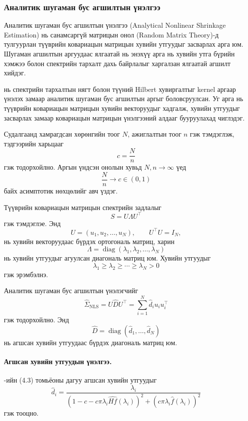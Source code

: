 
\subsubsection{Аналитик шугаман бус агшилтын үнэлгээ}

Аналитик шугаман бус агшилтын үнэлгээ
(Analytical Nonlinear Shrinkage Estimation) нь
санамсаргүй матрицын онол (Random Matrix Theory)-д
тулгуурлан түүврийн ковариацын матрицын хувийн
утгуудыг засварлах арга юм. Шугаман агшилтын
аргуудаас ялгаатай нь энэхүү арга нь хувийн
утга бүрийн хэмжээ болон спектрийн тархалт дахь
байрлалыг харгалзан ялгаатай агшилт хийдэг.

\citet{ledoitwolf2020} нь спектрийн тархалтын
нягт болон түүний Hilbert хувиргалтыг kernel
аргаар үнэлэх замаар аналитик шугаман бус
агшилтын аргыг боловсруулсан. Уг арга нь
түүврийн ковариацын матрицын хувийн
векторуудыг хадгалж, хувийн утгуудыг
засварлах замаар ковариацын матрицын
үнэлгээний алдааг бууруулахад чиглэдэг.

Судалгаанд хамрагдсан хөрөнгийн тоог $N$,
ажиглалтын тоог $n$ гэж тэмдэглэж,
тэдгээрийн харьцааг
\[
c=\frac{N}{n}
\]
гэж тодорхойлно. Аргын үндсэн онолын хувьд
$N,n\to\infty$ үед
\[
\frac{N}{n}\longrightarrow c\in(0,1)
\]
байх асимптотик нөхцөлийг авч үздэг.

Түүврийн ковариацын матрицын спектрийн
задлалыг
\[
S=U\Lambda U^{\top}
\]
гэж тэмдэглэе. Энд
\[
U=(u_1,u_2,\ldots,u_N),
\qquad
U^{\top}U=I_N,
\]
нь хувийн векторуудаас бүрдэх ортогональ
матриц, харин
\[
\Lambda
=
\operatorname{diag}
(\lambda_1,\lambda_2,\ldots,\lambda_N)
\]
нь хувийн утгуудыг агуулсан диагональ
матриц юм. Хувийн утгуудыг
\[
\lambda_1\geq\lambda_2\geq\cdots
\geq\lambda_N>0
\]
гэж эрэмбэлнэ.

Аналитик шугаман бус агшилтын үнэлэгчийг
\[
\widehat{\Sigma}_{\mathrm{NLS}}
=
U\widehat{D}U^{\top}
=
\sum_{i=1}^{N}
\widehat{d}_i u_i u_i^{\top}
\]
гэж тодорхойлно. Энд
\[
\widehat{D}
=
\operatorname{diag}
(\widehat{d}_1,\ldots,\widehat{d}_N)
\]
нь агшсан хувийн утгуудаас бүрдэх
диагональ матриц юм.

\paragraph{Агшсан хувийн утгуудын үнэлгээ.}

\citet{ledoitwolf2020}-ийн (4.3) томьёоны
дагуу агшсан хувийн утгуудыг
\[
\widehat{d}_i
=
\frac{\lambda_i}
{
	\left(
	1-c-c\pi\lambda_i
	\widehat{Hf}(\lambda_i)
	\right)^2
	+
	\left(
	c\pi\lambda_i
	\widehat{f}(\lambda_i)
	\right)^2
}
\]
гэж тооцно.

